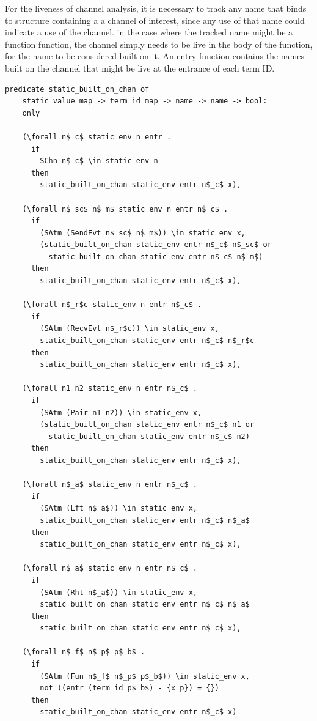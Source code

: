 \documentclass[10pt]{article}
\begin{document}
For the liveness of channel analysis, it is necessary to track any name that binds to structure
containing a a channel of interest, since any use of that name could indicate a use of the
channel. in the case where the tracked name might be a function function, the channel simply
needs to be live in the body of the function, for the name to be considered built on it.
An entry function contains the names built on the channel that might be live at the entrance
of each term ID.

\begin{lstlisting}[language=logic, mathescape]
  predicate static_built_on_chan of
    static_value_map -> term_id_map -> name -> name -> bool:
    only

    (\forall n$_c$ static_env n entr .
      if 
        SChn n$_c$ \in static_env n 
      then 
        static_built_on_chan static_env entr n$_c$ x),

    (\forall n$_sc$ n$_m$ static_env n entr n$_c$ . 
      if
        (SAtm (SendEvt n$_sc$ n$_m$)) \in static_env x,
        (static_built_on_chan static_env entr n$_c$ n$_sc$ or
          static_built_on_chan static_env entr n$_c$ n$_m$)
      then 
        static_built_on_chan static_env entr n$_c$ x),

    (\forall n$_r$c static_env n entr n$_c$ . 
      if  
        (SAtm (RecvEvt n$_r$c)) \in static_env x,
        static_built_on_chan static_env entr n$_c$ n$_r$c
      then 
        static_built_on_chan static_env entr n$_c$ x),

    (\forall n1 n2 static_env n entr n$_c$ . 
      if  
        (SAtm (Pair n1 n2)) \in static_env x,
        (static_built_on_chan static_env entr n$_c$ n1 or
          static_built_on_chan static_env entr n$_c$ n2)
      then 
        static_built_on_chan static_env entr n$_c$ x),

    (\forall n$_a$ static_env n entr n$_c$ .
      if
        (SAtm (Lft n$_a$)) \in static_env x,
        static_built_on_chan static_env entr n$_c$ n$_a$
      then 
        static_built_on_chan static_env entr n$_c$ x),

    (\forall n$_a$ static_env n entr n$_c$ .
      if
        (SAtm (Rht n$_a$)) \in static_env x,
        static_built_on_chan static_env entr n$_c$ n$_a$
      then 
        static_built_on_chan static_env entr n$_c$ x),

    (\forall n$_f$ n$_p$ p$_b$ .
      if
        (SAtm (Fun n$_f$ n$_p$ p$_b$)) \in static_env x,
        not ((entr (term_id p$_b$) - {x_p}) = {})
      then
        static_built_on_chan static_env entr n$_c$ x)
  \end{lstlisting}
\end{document}
